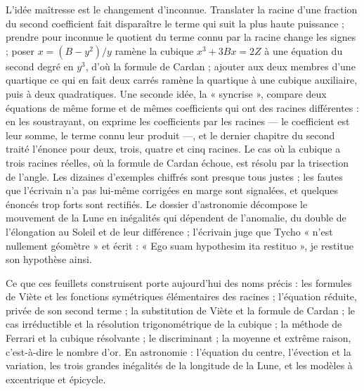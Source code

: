\documentclass[11pt,a4paper]{article}
\begin{document}
\begin{resume}
L'idée maîtresse est le changement d'inconnue. Translater la racine d'une
fraction du second coefficient fait disparaître le terme qui suit la plus haute
puissance ; prendre pour inconnue le quotient du terme connu par la racine
change les signes ; poser $x = (B - y^2)/y$ ramène la cubique $x^3 + 3Bx = 2Z$ à
une équation du second degré en $y^3$, d'où la formule de Cardan ; ajouter aux
deux membres d'une quartique ce qui en fait deux carrés ramène la quartique à
une cubique auxiliaire, puis à deux quadratiques. Une seconde idée, la
« syncrise », compare deux équations de même forme et de mêmes coefficients qui
ont des racines différentes : en les soustrayant, on exprime les coefficients
par les racines — le coefficient est leur somme, le terme connu leur produit —,
et le dernier chapitre du second traité l'énonce pour deux, trois, quatre et
cinq racines. Le cas où la cubique a trois racines réelles, où la formule de
Cardan échoue, est résolu par la trisection de l'angle. Les dizaines d'exemples
chiffrés sont presque tous justes ; les fautes que l'écrivain n'a pas lui-même
corrigées en marge sont signalées, et quelques énoncés trop forts sont rectifiés.
Le dossier d'astronomie décompose le mouvement de la Lune en inégalités qui
dépendent de l'anomalie, du double de l'élongation au Soleil et de leur
différence ; l'écrivain juge que Tycho « n'est nullement géomètre » et écrit :
« Ego suam hypothesim ita restituo », je restitue son hypothèse ainsi.

Ce que ces feuillets construisent porte aujourd'hui des noms précis : les
formules de Viète et les fonctions symétriques élémentaires des racines ;
l'équation réduite, privée de son second terme ; la substitution de Viète et la
formule de Cardan ; le cas irréductible et la résolution trigonométrique de la
cubique ; la méthode de Ferrari et la cubique résolvante ; le discriminant ; la
moyenne et extrême raison, c'est-à-dire le nombre d'or. En astronomie :
l'équation du centre, l'évection et la variation, les trois grandes inégalités
de la longitude de la Lune, et les modèles à excentrique et épicycle.

\end{resume}
\end{document}
